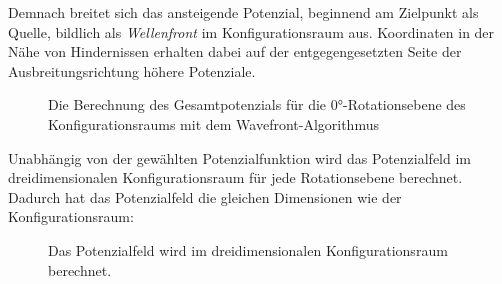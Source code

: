 \newpage
Demnach breitet sich das ansteigende Potenzial, beginnend am Zielpunkt als Quelle, bildlich als \textit{Wellenfront} im Konfigurationsraum aus. Koordinaten in der Nähe von Hindernissen erhalten dabei auf der entgegengesetzten Seite der Ausbreitungsrichtung höhere Potenziale.

\begin{figure}[H]
	\centering
	\footnotesize
	\centerline{}
	\caption{Die Berechnung des Gesamtpotenzials für die $0$°-Rotationsebene des Konfigurationsraums mit dem Wavefront-Algorithmus}
\end{figure}

\vspace*{1cm}
Unabhängig von der gewählten Potenzialfunktion wird das Potenzialfeld im dreidimensionalen Konfigurationsraum für jede Rotationsebene berechnet.
Dadurch hat das Potenzialfeld die gleichen Dimensionen wie der Konfigurationsraum:

\begin{figure}[H]
	\centering
	\footnotesize
	\centerline{}
	\caption{Das Potenzialfeld wird im dreidimensionalen Konfigurationsraum berechnet.}
\end{figure}



